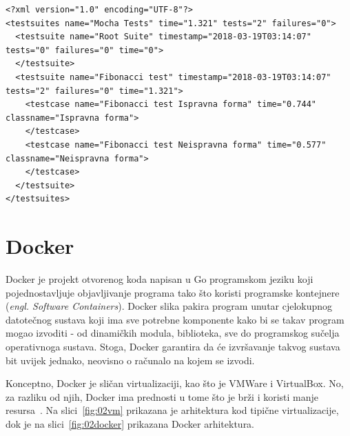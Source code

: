\begin{lstlisting}[float=h]
<?xml version="1.0" encoding="UTF-8"?>
<testsuites name="Mocha Tests" time="1.321" tests="2" failures="0">
  <testsuite name="Root Suite" timestamp="2018-03-19T03:14:07" tests="0" failures="0" time="0">
  </testsuite>
  <testsuite name="Fibonacci test" timestamp="2018-03-19T03:14:07" tests="2" failures="0" time="1.321">
    <testcase name="Fibonacci test Ispravna forma" time="0.744" classname="Ispravna forma">
    </testcase>
    <testcase name="Fibonacci test Neispravna forma" time="0.577" classname="Neispravna forma">
    </testcase>
  </testsuite>
</testsuites>
\end{lstlisting}

\section{Docker}
Docker je projekt otvorenog koda napisan u Go programskom jeziku koji pojednostavljuje objavljivanje
programa tako što koristi programske kontejnere (\textit{engl. Software Containers}). Docker slika
pakira program unutar cjelokupnog datotečnog sustava koji ima sve potrebne komponente kako bi se
takav program mogao izvoditi - od dinamičkih modula, biblioteka, sve do programskog sučelja
operativnoga sustava. Stoga, Docker garantira da će izvršavanje takvog sustava bit uvijek jednako,
neovisno o računalo na kojem se izvodi.

Konceptno, Docker je sličan virtualizaciji, kao što je VMWare i VirtualBox. No, za razliku od njih,
Docker ima prednosti u tome što je brži i koristi manje resursa~\citep{leszko2017continuous}. Na
slici~\ref{fig:02vm} prikazana je arhitektura kod tipične virtualizacije, dok je na
slici~\ref{fig:02docker} prikazana  Docker arhitektura.


